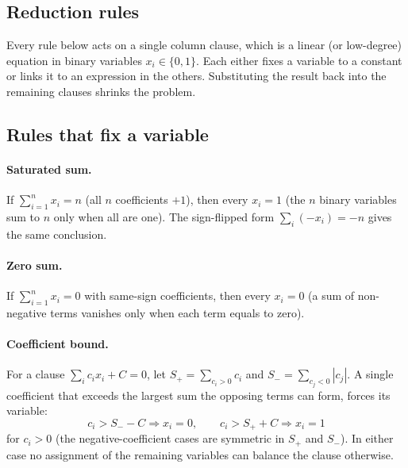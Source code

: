 \documentclass[pdflatex,sn-apa]{sn-jnl}%
\theoremstyle{thmstyleone}%
\theoremstyle{thmstyletwo}%
\theoremstyle{thmstylethree}%
\begin{document}
\begin{appendices}

\section{Reduction rules}\label{app:rules}

Every rule below acts on a single column clause, which is a linear (or low-degree) equation in binary variables $x_i \in \{0,1\}$. Each either fixes a variable to a constant or links it to an expression in the others. Substituting the result back into the remaining clauses shrinks the problem.

\subsection{Rules that fix a variable}

\paragraph{Saturated sum.} If $\sum_{i=1}^n x_i = n$ (all $n$ coefficients $+1$), then every $x_i = 1$ (the $n$ binary variables sum to $n$ only when all are one). The sign-flipped form $\sum_i (-x_i) = -n$ gives the same conclusion.

\paragraph{Zero sum.} If $\sum_{i=1}^n x_i = 0$ with same-sign coefficients, then every $x_i = 0$ (a sum of non-negative terms vanishes only when each term equals to zero).

\paragraph{Coefficient bound.} For a clause $\sum_i c_i x_i + C = 0$, let $S_+ = \sum_{c_i > 0} c_i$ and $S_- = \sum_{c_j < 0} |c_j|$. A single coefficient that exceeds the largest sum the opposing terms can form, forces its variable:
\begin{equation*}
  c_i > S_- - C \Rightarrow x_i = 0,
  \qquad
  c_i > S_+ + C \Rightarrow x_i = 1
\end{equation*}
for $c_i > 0$ (the negative-coefficient cases are symmetric in $S_+$ and $S_-$). In either case no assignment of the remaining variables can balance the clause otherwise.


\end{appendices}
\end{document}
